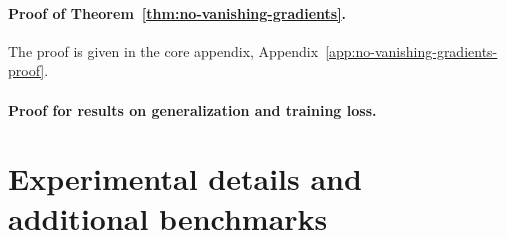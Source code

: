 \paragraph{Proof of Theorem~\ref{thm:no-vanishing-gradients}.}
The proof is given in the core appendix, Appendix~\ref{app:no-vanishing-gradients-proof}.

\paragraph{Proof for results on generalization and training loss.}
\label{app:generalization-training-loss-proof}

\section{Experimental details and additional benchmarks}
\label{app:experimental-details}
